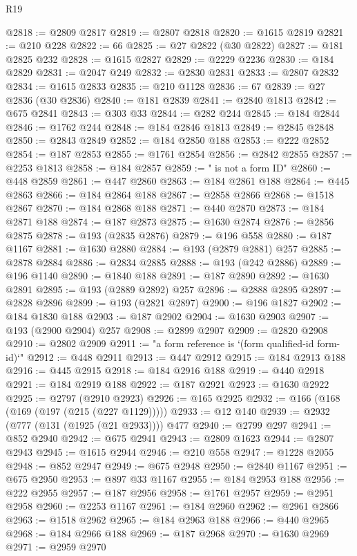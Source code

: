 \begin{lexlean}{R19}
\begin{coremodule}
@2818 := @2809 @2817
@2819 := @2807 @2818
@2820 := @1615 @2819
@2821 := @210 @228
@2822 := 66
@2825 := @27 @2822 (@30 @2822)
@2827 := @181 @2825 @232
@2828 := @1615 @2827
@2829 := @2229 @2236
@2830 := @184 @2829
@2831 := @2047 @249
@2832 := @2830 @2831
@2833 := @2807 @2832
@2834 := @1615 @2833
@2835 := @210 @1128
@2836 := 67
@2839 := @27 @2836 (@30 @2836)
@2840 := @181 @2839
@2841 := @2840 @1813
@2842 := @675 @2841
@2843 := @303 @33
@2844 := @282 @244
@2845 := @184 @2844
@2846 := @1762 @244
@2848 := @184 @2846 @1813
@2849 := @2845 @2848
@2850 := @2843 @2849
@2852 := @184 @2850 @188
@2853 := @222 @2852
@2854 := @187 @2853
@2855 := @1761 @2854
@2856 := @2842 @2855
@2857 := @2253 @1813
@2858 := @184 @2857
@2859 := " is not a form ID"
@2860 := @448 @2859
@2861 := @447 @2860
@2863 := @184 @2861 @188
@2864 := @445 @2863
@2866 := @184 @2864 @188
@2867 := @2858 @2866
@2868 := @1518 @2867
@2870 := @184 @2868 @188
@2871 := @440 @2870
@2873 := @184 @2871 @188
@2874 := @187 @2873
@2875 := @1630 @2874
@2876 := @2856 @2875
@2878 := @193 (@2835 @2876)
@2879 := @196 @558
@2880 := @187 @1167
@2881 := @1630 @2880
@2884 := @193 (@2879 @2881) @257
@2885 := @2878 @2884
@2886 := @2834 @2885
@2888 := @193 (@242 @2886)
@2889 := @196 @1140
@2890 := @1840 @188
@2891 := @187 @2890
@2892 := @1630 @2891
@2895 := @193 (@2889 @2892) @257
@2896 := @2888 @2895
@2897 := @2828 @2896
@2899 := @193 (@2821 @2897)
@2900 := @196 @1827
@2902 := @184 @1830 @188
@2903 := @187 @2902
@2904 := @1630 @2903
@2907 := @193 (@2900 @2904) @257
@2908 := @2899 @2907
@2909 := @2820 @2908
@2910 := @2802 @2909
@2911 := "a form reference is `(form qualified-id form-id)`"
@2912 := @448 @2911
@2913 := @447 @2912
@2915 := @184 @2913 @188
@2916 := @445 @2915
@2918 := @184 @2916 @188
@2919 := @440 @2918
@2921 := @184 @2919 @188
@2922 := @187 @2921
@2923 := @1630 @2922
@2925 := @2797 (@2910 @2923)
@2926 := @165 @2925
@2932 := @166 (@168 (@169 (@197 (@215 (@227 @1129)))))
@2933 := @12 @140
@2939 := @2932 (@777 (@131 (@1925 (@21 @2933)))) @477
@2940 := @2799 @297
@2941 := @852 @2940
@2942 := @675 @2941
@2943 := @2809 @1623
@2944 := @2807 @2943
@2945 := @1615 @2944
@2946 := @210 @558
@2947 := @1228 @2055
@2948 := @852 @2947
@2949 := @675 @2948
@2950 := @2840 @1167
@2951 := @675 @2950
@2953 := @897 @33 @1167
@2955 := @184 @2953 @188
@2956 := @222 @2955
@2957 := @187 @2956
@2958 := @1761 @2957
@2959 := @2951 @2958
@2960 := @2253 @1167
@2961 := @184 @2960
@2962 := @2961 @2866
@2963 := @1518 @2962
@2965 := @184 @2963 @188
@2966 := @440 @2965
@2968 := @184 @2966 @188
@2969 := @187 @2968
@2970 := @1630 @2969
@2971 := @2959 @2970

\end{coremodule}
\end{lexlean}
